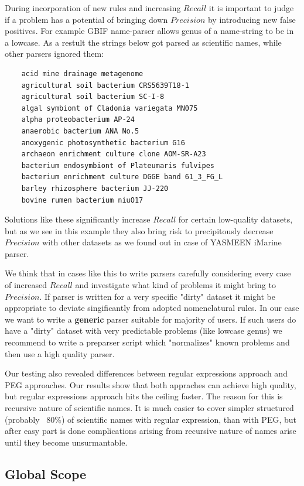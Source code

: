 \documentclass{bmcart}
\begin{document}
During incorporation of new rules and increasing $Recall$ it is important to
judge if a problem has a potential of bringing down $Precision$ by introducing
new false positives.  For example GBIF name-parser allows genus of a
name-string to be in a lowcase. As a restult the strings below got parsed as
scientific names, while other parsers ignored them:


\begin{verbatim}
    acid mine drainage metagenome
    agricultural soil bacterium CRS5639T18-1
    agricultural soil bacterium SC-I-8
    algal symbiont of Cladonia variegata MN075
    alpha proteobacterium AP-24
    anaerobic bacterium ANA No.5
    anoxygenic photosynthetic bacterium G16
    archaeon enrichment culture clone AOM-SR-A23
    bacterium endosymbiont of Plateumaris fulvipes
    bacterium enrichment culture DGGE band 61_3_FG_L
    barley rhizosphere bacterium JJ-220
    bovine rumen bacterium niuO17
\end{verbatim}

Solutions like these significantly increase $Recall$ for certain low-quality
datasets, but as we see in this example they also bring risk to precipitously
decrease $Precision$ with other datasets as we found out in case of YASMEEN
iMarine parser.

We think that in cases like this to write parsers carefully considering every
case of increased $Recall$ and investigate what kind of problems it might
bring to $Precision$. If parser is written for a very specific "dirty" dataset
it might be appropriate to deviate singificantly from adopted nomenclatural
rules. In our case we want to write a \textbf{generic} parser suitable for
majority of users. If such users do have a "dirty" dataset with very
predictable problems (like lowcase genus) we recommend to write a preparser
script which "normalizes" known problems and then use a high quality parser.

Our testing also revealed differences between regular expressions approach and
PEG approaches. Our results show that both appraches can achieve high quality,
but regular expressions approach hits the ceiling faster. The reason for this
is recursive nature of scientific names. It is much easier to cover simpler
structured (probably ~80\%) of scientific names with regular expression, than
with PEG, but after easy part is done complications arising from recursive
nature of names arise until they become unsurmantable.

\subsection*{Global Scope}
\end{document}
